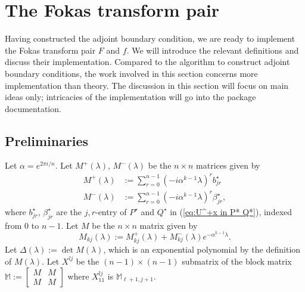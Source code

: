 \documentclass[11pt, oneside, a4paper]{article}
\begin{document}
\section{The Fokas transform pair}
Having constructed the adjoint boundary condition, we are ready to implement the Fokas transform pair $F$ and $f$\cite[p.10]{Smith2016}. We will introduce the relevant definitions and discuss their implementation. Compared to the algorithm to construct adjoint boundary conditions, the work involved in this section concerns more implementation than theory. The discussion in this section will focus on main ideas only; intricacies of the implementation will go into the package documentation.

\subsection{Preliminaries}
Let $\alpha = e^{2\pi i/n}$. Let $M^+(\lambda)$, $M^-(\lambda)$ be the $n\times n$ matrices given by
\begin{align*}
    M^+(\lambda) &:= \sum_{r=0}^{n-1}(-i\alpha^{k-1}\lambda)^r b^\star_{jr}\\
    M^-(\lambda) &:= \sum_{r=0}^{n-1}(-i\alpha^{k-1}\lambda)^r \beta^\star_{jr},
\end{align*}
where $b^\star_{jr}$, $\beta^\star_{jr}$ are the $j,r$-entry of $P^\star$ and $Q^\star$ in (\ref{eq:U^+x in P* Q*}), indexed from $0$ to $n-1$. Let $M$ be the $n\times n$ matrix given by
\[M_{kj}(\lambda) := M^+_{kj}(\lambda) + M^-_{kj}(\lambda)e^{-\alpha^{k-1}\lambda}.\]
Let $\Delta(\lambda):=\det M(\lambda)$, which is an exponential polynomial by the definition of $M(\lambda)$. Let $X^{lj}$ be the $(n-1)\times (n-1)$ submatrix of the block matrix $\mathbb{M}:=\begin{bmatrix}M & M\\ M & M\end{bmatrix}$ where $X^{lj}_{11}$ is $\mathbb{M}_{\ell+1, j+1}$.
\end{document}
